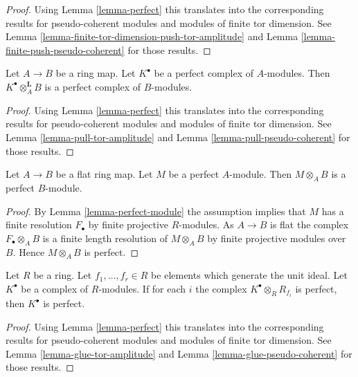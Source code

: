 \begin{proof}
Using
Lemma \ref{lemma-perfect}
this translates into the corresponding results for pseudo-coherent modules
and modules of finite tor dimension. See
Lemma \ref{lemma-finite-tor-dimension-push-tor-amplitude}
and
Lemma \ref{lemma-finite-push-pseudo-coherent}
for those results.
\end{proof}

\begin{lemma}
\label{lemma-pull-perfect}
Let $A \to B$ be a ring map.
Let $K^\bullet$ be a perfect
complex of $A$-modules. Then $K^\bullet \otimes_A^{\mathbf{L}} B$
is a perfect complex of $B$-modules.
\end{lemma}

\begin{proof}
Using
Lemma \ref{lemma-perfect}
this translates into the corresponding results for pseudo-coherent modules
and modules of finite tor dimension. See
Lemma \ref{lemma-pull-tor-amplitude}
and
Lemma \ref{lemma-pull-pseudo-coherent}
for those results.
\end{proof}

\begin{lemma}
\label{lemma-flat-base-change-perfect}
Let $A \to B$ be a flat ring map. Let $M$ be a perfect $A$-module.
Then $M \otimes_A B$ is a perfect $B$-module.
\end{lemma}

\begin{proof}
By
Lemma \ref{lemma-perfect-module}
the assumption implies that $M$ has a finite resolution $F_\bullet$ by
finite projective $R$-modules. As $A \to B$ is flat the complex
$F_\bullet \otimes_A B$ is a finite length resolution of $M \otimes_A B$
by finite projective modules over $B$. Hence $M \otimes_A B$ is perfect.
\end{proof}

\begin{lemma}
\label{lemma-glue-perfect}
Let $R$ be a ring. Let $f_1, \ldots, f_r \in R$ be elements which
generate the unit ideal. Let $K^\bullet$
be a complex of $R$-modules. If for each $i$ the complex
$K^\bullet \otimes_R R_{f_i}$ is perfect,
then $K^\bullet$ is perfect.
\end{lemma}

\begin{proof}
Using
Lemma \ref{lemma-perfect}
this translates into the corresponding results for pseudo-coherent modules
and modules of finite tor dimension. See
Lemma \ref{lemma-glue-tor-amplitude}
and
Lemma \ref{lemma-glue-pseudo-coherent}
for those results.
\end{proof}

